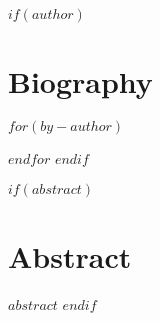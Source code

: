 \maketitle

$if(author)$
\section*{Biography}
$for(by-author)$


$endfor$
$endif$

$if(abstract)$
\section*{Abstract}
$abstract$
$endif$
